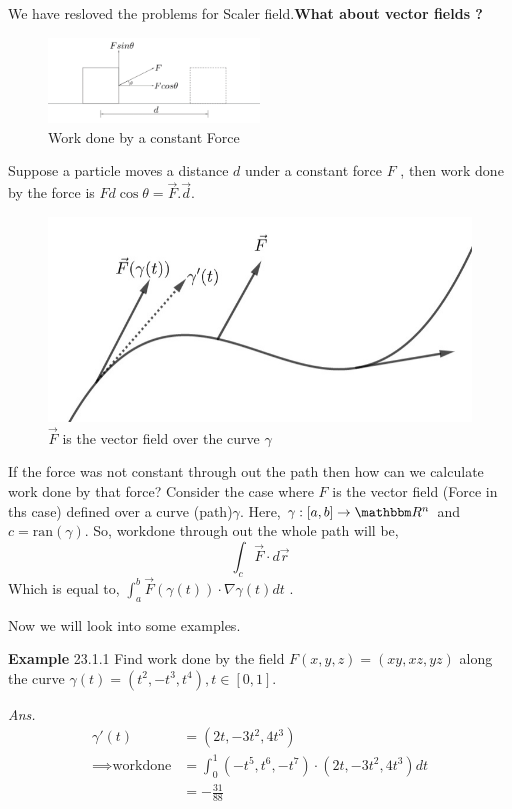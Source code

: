\documentclass[Analysis-3]{subfiles}
\begin{document}
We have resloved the problems for Scaler field.\textbf{What about vector fields ?}
\begin{figure}[H]
    \centering
    \includegraphics[width=0.5\textwidth]{figures/lec-23.2.png}
    \caption{Work done by a constant Force}
\end{figure}
Suppose a particle moves a distance $d$ under a constant force $F$ , then work done by the force is $Fd\cos \theta = \vec{F}.\vec{d}$.


\begin{figure}
    \centering
    \includegraphics[width=.98\linewidth]{figures/lec-23.3.png}
    \caption{$\vec{F}$ is the vector field over the curve $\gamma$}
\end{figure}

If the force was not constant through out the path then how can we calculate work done by that force?
Consider the case where $F$ is the vector field (Force in ths case) defined over a curve (path)$\gamma$. Here, $\gamma : [a,b] \to \R^n$ and $c = \text{ran}(\gamma)$. So, workdone through out the whole path will be,
\[\int_c \vec{F}\cdot d\vec{r}\]
Which is equal to, $\int_a^b \vec{F}(\gamma(t))\cdot \nabla \gamma(t) dt$ .

Now we will look into some examples.
\vspace{0.3cm}

\textbf{Example} 23.1.1  Find work done by the field $F(x,y,z) = (xy,xz,yz)$ along the curve $\gamma(t) = (t^2,-t^3,t^4),t \in [0,1]$.

\textit{Ans.} \begin{align*}
    \gamma'(t)               & = (2t,-3t^2,4t^3)                                 \\
    \implies \text{workdone} & = \int_0^1 (-t^5,t^6,-t^7)\cdot(2t,-3t^2,4t^3) dt \\
                             & = -\frac{31}{88}
\end{align*}
\end{document}
